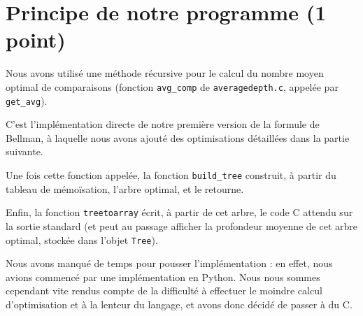 \documentclass[a4paper, 10pt, french]{article}
\begin{document}
%
%

\section{Principe de notre  programme (1 point)}
{Nous avons utilisé une méthode récursive pour le calcul du nombre moyen optimal de comparaisons (fonction \verb?avg_comp? de \verb?averagedepth.c?, appelée par \verb?get_avg?).

C'est l'implémentation directe de notre première version de la formule de Bellman, à laquelle nous avons ajouté des optimisations détaillées dans la partie suivante.

Une fois cette fonction appelée, la fonction \verb?build_tree? construit, à partir du tableau de mémoïsation, l'arbre optimal, et le retourne.

Enfin, la fonction \verb?treetoarray? écrit, à partir de cet arbre, le code C attendu sur la sortie standard (et peut au passage afficher la profondeur moyenne de cet arbre optimal, stockée dans l'objet \verb?Tree?).

Nous avons manqué de temps pour pousser l'implémentation : en effet, nous avions commencé par une implémentation en Python. Nous nous sommes cependant vite rendus compte de la difficulté à effectuer le moindre calcul d'optimisation et à la lenteur du langage, et avons donc décidé de passer à du C.
} 
\end{document}
